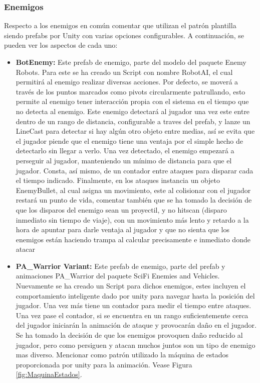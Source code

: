 \subsubsection{Enemigos}
Respecto a los enemigos en común comentar que utilizan el patrón plantilla siendo prefabs por Unity con varias opciones configurables. A continuación, se pueden ver los aspectos de cada uno:
\begin{itemize}
	\item \textbf{BotEnemy:} Este prefab de enemigo, parte del modelo del paquete Enemy Robots. Para este se ha creado un Script con nombre RobotAI, el cual permitirá al enemigo realizar diversas acciones. Por defecto, se moverá a través de los puntos marcados como pivots circularmente patrullando, esto permite al enemigo tener interacción propia con el sistema en el tiempo que no detecta al enemigo. Este enemigo detectará al jugador una vez este entre dentro de un rango de distancia, configurable a traves del prefab, y lanze un LineCast para detectar si hay algún otro objeto entre medias, así se evita que el jugador piende que el enemigo tiene una ventaja por el simple hecho de detectarlo sin llegar a verlo. Una vez detectado, el enemigo empezará a perseguir al jugador, manteniendo un mínimo de distancia para que el jugador. Consta, así mismo, de un contador entre ataques para disparar cada el tiempo indicado. Finalmente, en los ataques instancia un objeto EnemyBullet, al cual asigna un movimiento, este al colisionar con el jugador restará un punto de vida, comentar también que se ha tomado la decisión de que los disparos del enemigo sean un proyectil, y no hitscan (disparo inmediato sin tiempo de viaje), con un movimiento más lento y retardo a la hora de apuntar para darle ventaja al jugador y que no sienta que los enemigos están haciendo trampa al calcular precisamente e inmediato donde atacar
	\item \textbf{PA\_Warrior Variant:} Este prefab de enemigo, parte del prefab y animaciones PA\_Warrior del paquete SciFi Enemies and Vehicles. Nuevamente se ha creado un Script para dichos enemigos, estes incluyen el comportamiento inteligente dado por unity para navegar hasta la posición del jugador. Una vez más tiene un contador para medir el tiempo entre ataques. Una vez pase el contador, si se encuentra en un rango suficientemente cerca del jugador iniciarán la animación de ataque y provocarán daño en el jugador. Se ha tomado la decisión de que los enemigos provoquen daño reducido al jugador, pero como persiguen y atacan muchos juntos son un tipo de enemigo mas diverso. Mencionar como patrón utilizado la máquina de estados proporcionada por unity para la animación. Vease Figura \ref{fig:MaquinaEstados}.
\end{itemize}

